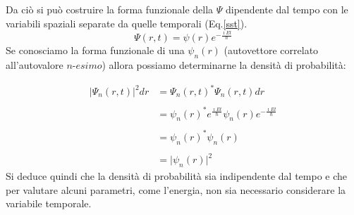 \documentclass[oneside]{amsbook}
\numberwithin{section}{chapter}
\numberwithin{equation}{section}
\numberwithin{figure}{section}
\begin{document}
Da ciò si può costruire la forma funzionale della $\Psi$ dipendente dal tempo con le variabili spaziali separate da quelle temporali (Eq.\ref{sst}).
\begin{equation}
\label{sst}
\Psi(r,t)= \psi(r)e^{-\frac{\imath E t}{\hslash}}
\end{equation}
Se conosciamo la forma funzionale di una $\psi_n(r)$ (autovettore correlato all'autovalore $n$-$esimo$) allora possiamo determinarne la densità di probabilità:

\begin{equation}
\label{modde}
\begin{aligned}
\rvert\Psi_n(r,t)\rvert^2 d r &= \Psi_n(r,t)^{*} \Psi_n(r,t)dr \\ \\
&= \psi_n(r)^*e^{\frac{\imath E t}{\hslash}}\psi_n(r)e^{-\frac{\imath E t}{\hslash}} \\ \\
&= \psi_n(r)^*\psi_n(r) \\ \\
&=\rvert\psi_n(r)\rvert^2
\end{aligned}
\end{equation}
Si deduce quindi che la densità di probabilità sia indipendente dal tempo e che per valutare alcuni parametri, come l'energia, non sia necessario considerare la variabile temporale.
\end{document}
